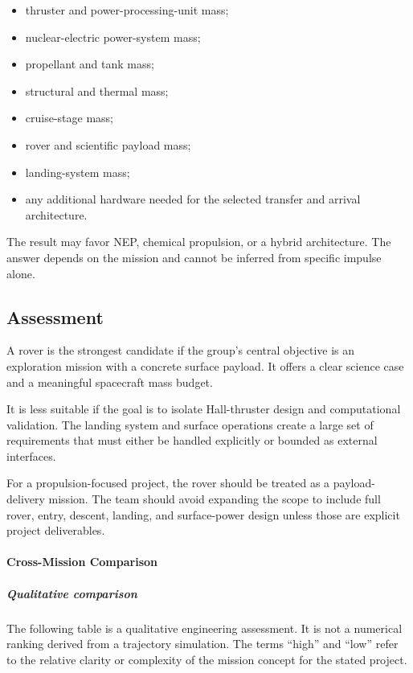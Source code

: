 \begin{itemize}
	\item thruster and power-processing-unit mass;
	\item nuclear-electric power-system mass;
	\item propellant and tank mass;
	\item structural and thermal mass;
	\item cruise-stage mass;
	\item rover and scientific payload mass;
	\item landing-system mass;
	\item any additional hardware needed for the selected
	      transfer and arrival architecture.
\end{itemize}

The result may favor NEP, chemical propulsion, or a hybrid
architecture. The answer depends on the mission and cannot
be inferred from specific impulse alone.

\subsection{Assessment}

A rover is the strongest candidate if the group's central
objective is an exploration mission with a concrete surface
payload. It offers a clear science case and a meaningful
spacecraft mass budget.

It is less suitable if the goal is to isolate Hall-thruster
design and computational validation. The landing system and
surface operations create a large set of requirements that
must either be handled explicitly or bounded as external
interfaces.

For a propulsion-focused project, the rover should be treated
as a payload-delivery mission. The team should avoid expanding
the scope to include full rover, entry, descent, landing,
and surface-power design unless those are explicit project
deliverables.

\paragraph{Cross-Mission Comparison}

\subparagraph{Qualitative comparison}

The following table is a qualitative engineering assessment.
It is not a numerical ranking derived from a trajectory simulation.
The terms ``high'' and ``low'' refer to the relative clarity
or complexity of the mission concept for the stated project.


